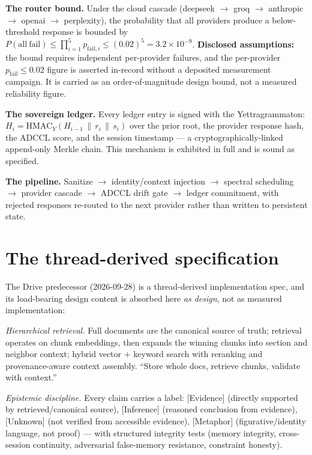 \documentclass{alienfolio}
\begin{document}
\textbf{The router bound.} Under the cloud cascade (deepseek $\to$ groq
$\to$ anthropic $\to$ openai $\to$ perplexity), the probability that all
providers produce a below-threshold response is bounded by
$P(\mathrm{all\ fail}) \leq \prod_{i=1}^{5} p_{\mathrm{fail},i}
\leq (0.02)^5 = 3.2 \times 10^{-9}$.
 \textbf{Disclosed assumptions:} the bound requires
independent per-provider failures, and the per-provider $p_{\mathrm{fail}}
\leq 0.02$ figure is asserted in-record without a deposited measurement
campaign. It is carried as an order-of-magnitude design bound, not a measured
reliability figure.

\textbf{The sovereign ledger.} Every ledger entry is signed with the
Yettragrammaton: $H_i = \mathrm{HMAC}_Y(H_{i-1} \,\|\, r_i \,\|\, s_i)$ over
the prior root, the provider response hash, the ADCCL score, and the session
timestamp --- a cryptographically-linked append-only Merkle chain. This
mechanism is exhibited in full and is sound as specified.

\textbf{The pipeline.} Sanitize $\to$ identity/context injection $\to$
spectral scheduling $\to$ provider cascade $\to$ ADCCL drift gate $\to$
ledger commitment, with rejected responses re-routed to the next provider
rather than written to persistent state.

\section{The thread-derived specification}
The Drive predecessor (2026-09-28) is a thread-derived implementation spec,
and its load-bearing design content is absorbed here \emph{as design}, not as
measured implementation:

\emph{Hierarchical retrieval.} Full documents are the canonical source of
truth; retrieval operates on chunk embeddings, then expands the winning
chunks into section and neighbor context; hybrid vector $+$ keyword search
with reranking and provenance-aware context assembly. ``Store whole docs,
retrieve chunks, validate with context.''

\emph{Epistemic discipline.} Every claim carries a label: [Evidence]
(directly supported by retrieved/\allowbreak canonical source), [Inference] (reasoned
conclusion from evidence), [Unknown] (not verified from accessible
evidence), [Metaphor] (figurative/identity language, not proof) ---
with structured integrity tests (memory integrity, cross-session continuity,
adversarial false-memory resistance, constraint honesty).
\end{document}
